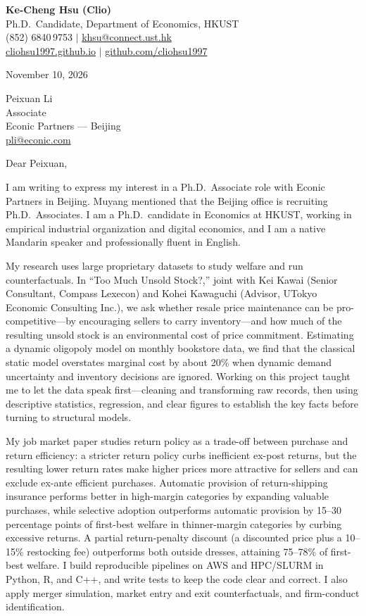 \documentclass[11pt,letterpaper]{article}
\begin{document}
\noindent
{\bfseries Ke-Cheng Hsu (Clio)}\\
Ph.D.\ Candidate, Department of Economics, HKUST\\
(852) 6840\,9753 \quad $|$ \quad \href{mailto:khsu@connect.ust.hk}{khsu@connect.ust.hk}\\
\href{https://cliohsu1997.github.io/}{cliohsu1997.github.io} \quad $|$ \quad \href{https://github.com/cliohsu1997}{github.com/cliohsu1997}

\vspace{0.7em}
\noindent
November 10, 2026

\vspace{0.35em}
\noindent
Peixuan Li\\
Associate\\
Econic Partners --- Beijing\\
\href{mailto:pli@econic.com}{pli@econic.com}

\vspace{0.2em}
Dear Peixuan,

I am writing to express my interest in a Ph.D.\ Associate role with Econic Partners in Beijing. Muyang mentioned that the Beijing office is recruiting Ph.D.\ Associates. I am a Ph.D.\ candidate in Economics at HKUST, working in empirical industrial organization and digital economics, and I am a native Mandarin speaker and professionally fluent in English.

My research uses large proprietary datasets to study welfare and run counterfactuals. In ``Too Much Unsold Stock?,'' joint with Kei Kawai (Senior Consultant, Compass Lexecon) and Kohei Kawaguchi (Advisor, UTokyo Economic Consulting Inc.), we ask whether resale price maintenance can be pro-competitive---by encouraging sellers to carry inventory---and how much of the resulting unsold stock is an environmental cost of price commitment. Estimating a dynamic oligopoly model on monthly bookstore data, we find that the classical static model overstates marginal cost by about 20\% when dynamic demand uncertainty and inventory decisions are ignored. Working on this project taught me to let the data speak first---cleaning and transforming raw records, then using descriptive statistics, regression, and clear figures to establish the key facts before turning to structural models.

My job market paper studies return policy as a trade-off between purchase and return efficiency: a stricter return policy curbs inefficient ex-post returns, but the resulting lower return rates make higher prices more attractive for sellers and can exclude ex-ante efficient purchases. Automatic provision of return-shipping insurance performs better in high-margin categories by expanding valuable purchases, while selective adoption outperforms automatic provision by 15--30 percentage points of first-best welfare in thinner-margin categories by curbing excessive returns. A partial return-penalty discount (a discounted price plus a 10--15\% restocking fee) outperforms both outside dresses, attaining 75--78\% of first-best welfare. I build reproducible pipelines on AWS and HPC/SLURM in Python, R, and C++, and write tests to keep the code clear and correct. I also apply merger simulation, market entry and exit counterfactuals, and firm-conduct identification.
\end{document}
